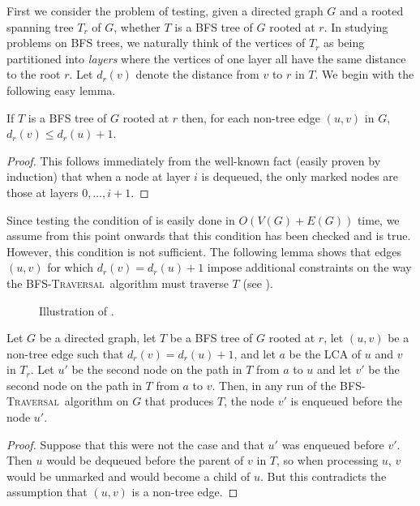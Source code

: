 \documentclass[lotsofwhite]{patmorin}
\newcommand{\bfst}{\textsc{BFS-Traversal}}
\newcommand{\layer}{d}
\begin{document}
First we consider the problem of testing, given a directed graph $G$
and a rooted spanning tree $T_r$ of $G$, whether $T$ is a BFS tree of
$G$ rooted at $r$.  In studying problems on BFS trees, we naturally
think of the vertices of $T_r$ as being partitioned into \emph{layers}
where the vertices of one layer all have the same distance to the root
$r$.  Let $\layer_r(v)$ denote the distance from $v$ to $r$ in $T$.  We
begin with the following easy lemma.

\begin{lem} 
If $T$ is a BFS tree of $G$ rooted at $r$ then, for each non-tree edge
$(u,v)$ in $G$, $\layer_r(v)\le\layer_r(u)+1$.
\end{lem}

\begin{proof} 
This follows immediately from the well-known fact (easily proven by
induction) that when a node at layer $i$ is dequeued, the only marked
nodes are those at layers $0,\ldots,i+1$.
\end{proof}

Since testing the condition of  is easily done in
$O(V(G)+E(G))$ time, we assume from this point onwards that this
condition has been checked and is true. However, this condition is not
sufficient. The following lemma shows that edges $(u,v)$ for which
$\layer_r(v)=\layer_r(u)+1$ impose additional constraints on the way
the \bfst\ algorithm must traverse $T$ (see ).

\begin{figure}
\caption{Illustration of .}
\end{figure}


\begin{lem}
Let $G$ be a directed graph, let $T$ be a BFS tree of $G$ rooted at
$r$, let $(u,v)$ be a non-tree edge such that
$\layer_r(v)=\layer_r(u)+1$, and let $a$ be the LCA of $u$ and $v$ in
$T_r$.  Let $u'$ be the second node on the path in $T$ from $a$ to $u$
and let $v'$ be the second node on the path in $T$ from $a$ to $v$.
Then, in any run of the \bfst\ algorithm on $G$ that produces $T$, the
node $v'$ is enqueued before the node $u'$.
\end{lem}

\begin{proof}
Suppose that this were not the case and that $u'$ was enqueued before
$v'$.  Then $u$ would be dequeued before the parent of $v$ in $T$, so
when processing $u$, $v$ would be unmarked and would become a child of
$u$.  But this contradicts the assumption that $(u,v)$ is a non-tree
edge.
\end{proof}
\end{document}
